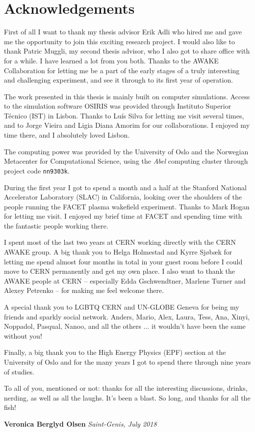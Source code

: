 \chapter*{Acknowledgements}

First of all I want to thank my thesis advisor Erik Adli who hired me and gave me the opportunity to join this exciting research project.
I would also like to thank Patric Muggli, my second thesis advisor, who I also got to share office with for a while.
I have learned a lot from you both.
Thanks to the AWAKE Collaboration for letting me be a part of the early stages of a truly interesting and challenging experiment, and see it through to its first year of operation.

The work presented in this thesis is mainly built on computer simulations.
Access to the simulation software OSIRIS was provided through Instituto Superior Técnico (IST) in Lisbon.
Thanks to Luís Silva for letting me visit several times, and to Jorge Vieira and Ligia Diana Amorim for our collaborations.
I enjoyed my time there, and I absolutely loved Lisbon.

The computing power was provided by the University of Oslo and the Norwegian Metacenter for Computational Science, using the \textit{Abel} computing cluster through project code \texttt{nn9303k}.

During the first year I got to spend a month and a half at the Stanford National Accelerator Laboratory (SLAC) in California, looking over the shoulders of the people running the FACET plasma wakefield experiment.
Thanks to Mark Hogan for letting me visit.
I enjoyed my brief time at FACET and spending time with the fantastic people working there.

I spent most of the last two years at CERN working directly with the CERN AWAKE group.
A big thank you to Helga Holmestad and Kyrre Sjøbæk for letting me spend almost four months in total in your guest room before I could move to CERN permanently and get my own place.
I also want to thank the AWAKE people at CERN -- especially Edda Gschwendtner, Marlene Turner and Alexey Petrenko -- for making me feel welcome there.

A special thank you to LGBTQ CERN and UN-GLOBE Geneva for being my friends and sparkly social network.
Anders, Mario, Alex, Laura, Tess, Ana, Xinyi, Noppadol, Pasqual, Nanoo, and all the others ... it wouldn't have been the same without you!

Finally, a big thank you to the High Energy Physics (EPF) section at the University of Oslo and for the many years I got to spend there through nine years of studies.

To all of you, mentioned or not: thanks for all the interesting discussions, drinks, nerding, as well as all the laughs.
It's been a blast.
So long, and thanks for all the fish!

\vfill
\null\hfill\textbf{Veronica Berglyd Olsen}
\newline
\null\hfill\textit{Saint-Genis, July 2018}
